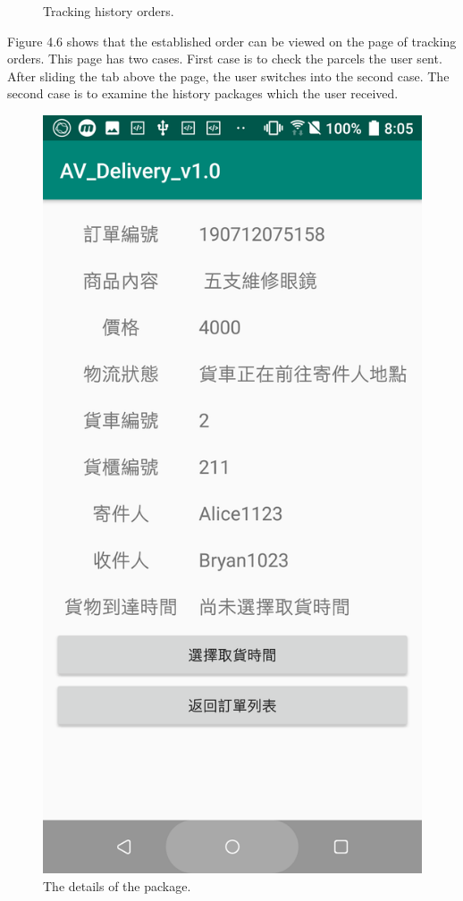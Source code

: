 \documentclass[12pt]{ksthesis}
\begin{document}
\begin{thesis}
{\begin{figure}[H]
\caption{Tracking history orders.}
\label{Tracking_history_orders}
\end{figure}

Figure 4.6 shows that the established order can be viewed on the page of tracking orders. This page has two cases. First case is to check the parcels the user sent. After sliding the tab above the page, the user switches into the second case. The second case is to examine the history packages which the user received.

\begin{figure}[H]
\centering
\includegraphics[scale=0.125]{./figures/F4-7-Details_package.PNG}
\caption{\large The details of the package.}
\vspace{0.5cm}
\label{Fig:details_of_package}
\end{figure} 


}
\end{thesis}
\end{document}
